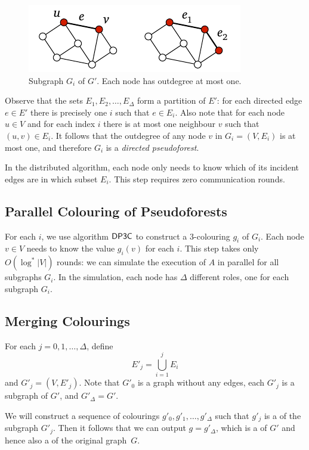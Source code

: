 \begin{figure}
    \centering
    \includegraphics[page=\PIdPickClass]{figs.pdf}
    \caption{Subgraph $G_i$ of $G'$. Each node has outdegree at most one.}\label{fig:id-pick-class}
\end{figure}
    
Observe that the sets $E_1, E_2, \dotsc, E_\Delta$ form a partition of $E'$: for each directed edge $e \in E'$ there is precisely one $i$ such that $e \in E_i$. Also note that for each node $u \in V$ and for each index $i$ there is at most one neighbour $v$ such that $(u,v) \in E_i$. It follows that the outdegree of any node $v$ in $G_i = (V,E_i)$ is at most one, and therefore $G_i$ is a \emph{directed pseudoforest}.
    
In the distributed algorithm, each node only needs to know which of its incident edges are in which subset $E_i$. This step requires zero communication rounds.

\subsection{Parallel Colouring of Pseudoforests}

For each $i$, we use algorithm $\textsf{DP3C}$ to construct a $3$-colouring $g_i$ of $G_i$. Each node $v \in V$ needs to know the value $g_i(v)$ for each $i$. This step takes only $O(\log^* |V|)$ rounds: we can simulate the execution of $A$ in parallel for all subgraphs $G_i$. In the simulation, each node has $\Delta$ different roles, one for each subgraph $G_i$.

\subsection{Merging Colourings}

For each $j = 0, 1, \dotsc, \Delta$, define
\[
    E'_j = \bigcup_{i = 1}^j E_i
\]
and $G'_j = (V,E'_j)$. Note that $G'_0$ is a graph without any edges, each $G'_j$ is a subgraph of $G'$, and $G'_\Delta = G'$.

We will construct a sequence of colourings $g'_0, g'_1, \dotsc, g'_\Delta$ such that $g'_j$ is a \Dpocol{} of the subgraph $G'_j$. Then it follows that we can output $g = g'_\Delta$, which is a \Dpocol{} of $G'$ and hence also a \Dpocol{} of the original graph~$G$.

